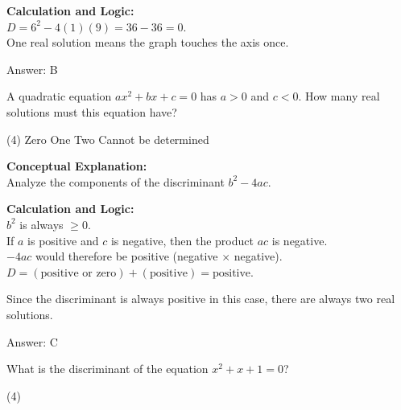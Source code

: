 \documentclass[11pt,paper=a4,answers]{exam}
\begin{document}
\begin{questions}
\begin{solution}
\textbf{Calculation and Logic:} \\
$D = 6^2 - 4(1)(9) = 36 - 36 = 0$. \\
One real solution means the graph touches the axis once.

\vspace{25pt}

Answer: \colorbox{yellow!100}{B}
\end{solution}

\vspace{40pt}

\question
A quadratic equation $ax^2 + bx + c = 0$ has $a > 0$ and $c < 0$. How many real solutions must this equation have?
\begin{tasks}(4)
    \task Zero
    \task One
    \task Two
    \task Cannot be determined
\end{tasks}

\begin{solution}
\textbf{Conceptual Explanation:} \\
Analyze the components of the discriminant $b^2 - 4ac$.

\vspace{20pt}

\textbf{Calculation and Logic:} \\
$b^2$ is always $\ge 0$. \\
If $a$ is positive and $c$ is negative, then the product $ac$ is negative. \\
$-4ac$ would therefore be positive (negative $\times$ negative). \\
$D = (\text{positive or zero}) + (\text{positive}) = \text{positive}$.

\vspace{10pt}

Since the discriminant is always positive in this case, there are always two real solutions.

\vspace{25pt}

Answer: \colorbox{yellow!100}{C}
\end{solution}

\vspace{40pt}

\question
What is the discriminant of the equation $x^2 + x + 1 = 0$?
\begin{tasks}(4)
\end{tasks}


\end{questions}
\end{document}
